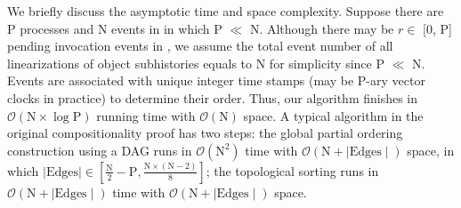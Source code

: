 \documentclass[a4paper,USenglish]{lipics-v2016}
\newcommand{\linz}{linearization}
\newcommand{\his}{\text{H}}
\begin{document}
We briefly discuss the asymptotic time and space complexity.
Suppose there are P processes and N events in {\his} in which P $\ll$ N.
Although there may be $r \in$ [0, P] pending invocation events in {\his},
we assume the total event number of all {\linz}s of object subhistories equals to N for simplicity since P $\ll$ N.
Events are associated with unique integer time stamps (may be P-ary vector clocks in practice) to determine their order.
Thus, our algorithm finishes in $\mathcal{O}(\text{N}\times\log{}\text{P})$ running time with $\mathcal{O}(\text{N})$ space.
A typical algorithm in the original compositionality proof has two steps:
the global partial ordering construction using a DAG runs in $\mathcal{O}(\text{N}^{2})$ time with $\mathcal{O}(\text{N} + \mid\text{Edges}\mid)$ space, in which $\mid\text{Edges}\mid \in [\frac{\text{N}}{2}-\text{P}, \frac{\text{N}\times(\text{N} - 2)}{8}]$;
the topological sorting runs in $\mathcal{O}(\text{N} + \mid\text{Edges}\mid)$ time with $\mathcal{O}(\text{N} + \mid\text{Edges}\mid)$ space.
\end{document}
